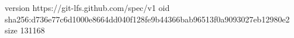 version https://git-lfs.github.com/spec/v1
oid sha256:d736e77c6d1000e8664dd040f128fe9b44366bab96513f0a9093027eb12980e2
size 131168
